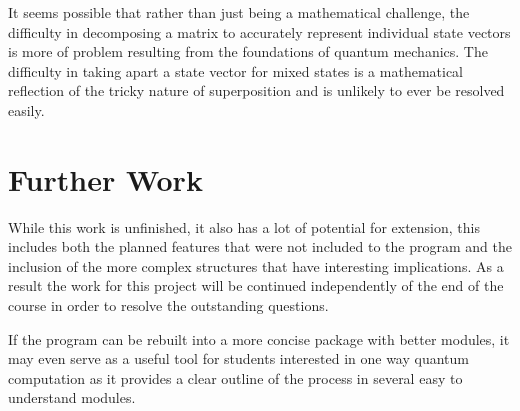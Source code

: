 It seems possible that rather than just being a mathematical challenge, the difficulty in decomposing a matrix to accurately represent individual state vectors is more of problem resulting from the foundations of quantum mechanics. The difficulty in taking apart a state vector for mixed states is a mathematical reflection of the tricky nature of superposition and is unlikely to ever be resolved easily.



\section{Further Work}

While this work is unfinished, it also has a lot of potential for extension, this includes both the planned features that were not included to the program and the inclusion of the more complex structures that have interesting implications. As a result the work for this project will be continued independently of the end of the course in order to resolve the outstanding questions. 

If the program can be rebuilt into a more concise package with better modules, it may even serve as a useful tool for students interested in one way quantum computation as it provides a clear outline of the process in several easy to understand modules. 
